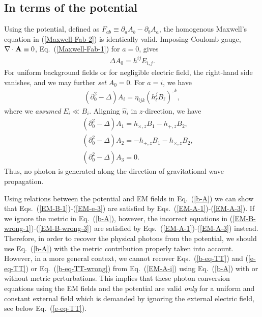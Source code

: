 \documentclass[twocolumn,amsmath,amssymb]{revtex4}
\newcommand{\bea}{\begin{eqnarray}}
\newcommand{\eea}{\end{eqnarray}}
\begin{document}
\subsection{In terms of the potential}
                                        \label{sec:potential}

Using the potential, defined as $F_{ab} \equiv \partial_a A_b - \partial_b A_a$, the homogenous Maxwell's equation in (\ref{Maxwell-Fab-2}) is identically valid. Imposing Coulomb gauge, $\nabla \cdot {\bf A} \equiv 0$, Eq.\ (\ref{Maxwell-Fab-1}) for $a = 0$, gives
\bea
   \Delta A_0 = h^{ij} E_{i,j}.
   \label{A_0}
\eea
For uniform background fields or for negligible electric field, the right-hand side vanishes, and we may further {\it set} $A_0 = 0$. For $a = i$, we have
\bea
   ( \partial_0^2 - \Delta ) A_i
       = \eta_{ijk} ( h^j_\ell B_\ell )^{,k},
   \label{EM-A-i}
\eea
where we {\it assumed} $E_i \ll B_i$. Aligning $\hat n_i$ in $z$-direction, we have
\bea
   & & ( \partial_0^2 - \Delta ) A_1
       = h_{\times,z} B_1 - h_{+,z} B_2,
   \label{EM-A-1} \\
   & & ( \partial_0^2 - \Delta ) A_2
       = - h_{+,z} B_1 - h_{\times,z} B_2,
   \label{EM-A-2} \\
   & & ( \partial_0^2 - \Delta ) A_3
       = 0.
   \label{EM-A-3}
\eea
Thus, no photon is generated along the direction of gravitational wave propagation.%

Using relations between the potential and EM fields in Eq.\ (\ref{b-A}) we can show that Eqs.\ (\ref{EM-B-1})-(\ref{EM-e-3}) are satisfied by Eqs.\ (\ref{EM-A-1})-(\ref{EM-A-3}). If we ignore the metric in Eq.\ (\ref{b-A}), however, the incorrect equations in (\ref{EM-B-wrong-1})-(\ref{EM-B-wrong-3}) are satisfied by Eqs.\ (\ref{EM-A-1})-(\ref{EM-A-3}) instead. Therefore, in order to recover the physical photons from the potential, we should use Eq.\ (\ref{b-A}) with the metric contribution properly taken into account. However, in a more general context, we cannot recover Eqs.\ (\ref{b-eq-TT}) and (\ref{e-eq-TT}) or Eq.\ (\ref{b-eq-TT-wrong}) from Eq.\ (\ref{EM-A-i}) using Eq.\ (\ref{b-A}) with or without metric perturbations. This implies that these photon conversion equations using the EM fields and the potential are valid {\it only} for a uniform and constant external field which is demanded by ignoring the external electric field, see below Eq.\ (\ref{e-eq-TT}).


%
%
%
\end{document}
